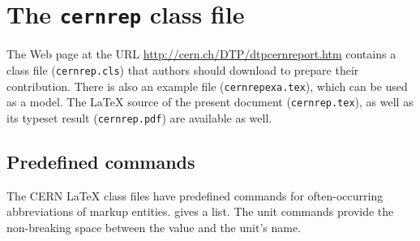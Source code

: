 \documentclass{cernyrep}
\begin{document}
\newpage
\appendix

\section{The \texttt{cernrep} class file}

The Web page at the URL \url{http://cern.ch/DTP/dtpcernreport.htm}
contains a class file (\texttt{cernrep.cls}) that authors should
download to prepare their contribution. There is also an example file
(\texttt{cernrepexa.tex}), which can be used as a model. The \LaTeX{}
source of the present document (\texttt{cernrep.tex}), as well as its
typeset result (\texttt{cernrep.pdf}) are available as well.

\subsection{Predefined commands}

The CERN \LaTeX{} class files have predefined commands for
often-occurring abbreviations of markup entities. 
gives a list. The unit commands provide the non-breaking space between
the value and the unit's name.
\end{document}
